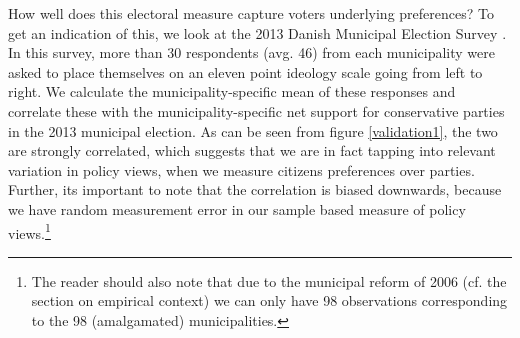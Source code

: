\documentclass[a4paper,12pt]{article}
\begin{document}
How well does this electoral measure capture voters underlying preferences? To get an indication of this, we look at the 2013 Danish Municipal Election Survey \cite{elklit2017kv13}. In this survey, more than 30 respondents (avg. 46) from each municipality were asked to place themselves on an eleven point ideology scale going from left to right. We calculate the municipality-specific mean of these responses and correlate these with the municipality-specific net support for conservative parties in the 2013 municipal election.  As can be seen from figure \ref{validation1}, the two are strongly correlated, which suggests that we are in fact tapping into relevant variation in policy views, when we measure citizens preferences over parties. Further, its important to note that the correlation is biased downwards, because we have random measurement error in our sample based measure of policy views.\footnote{The reader should also note that due to the municipal reform of 2006 (cf. the section on empirical context) we can only have 98 observations corresponding to the 98 (amalgamated) municipalities.}
\end{document}
